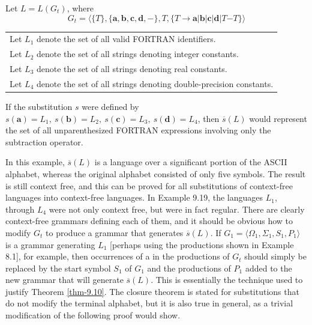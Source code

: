 Let $L=L(G_t)$, where
\[ G_t = \langle\{T\},\{\pmb{a},\pmb{b},\pmb{c},\pmb{d},\pmb{-}\},T,\{T
	\rightarrow\pmb{a}|\pmb{b}|\pmb{c}|\pmb{d}|T\pmb{-}T\}\rangle \]
\begin{center}\begin{tabular}{l}
Let $L_1$ denote the set of all valid FORTRAN identifiers. \\
Let $L_2$ denote the set of all strings denoting integer constants. \\
Let $L_3$ denote the set of all strings denoting real constants. \\
Let $L_4$ denote the set of all strings denoting double-precision constants. \\
\end{tabular}\end{center}
If the substitution $s$ were defined by $s(\pmb{a})=L_1,\ s(\pmb{b})=L_2,\ s(
\pmb{c})=L_3,\ s(\pmb{d})=L_4$, then $\overline{s}(L)$ would represent the set
of all unparenthesized FORTRAN expressions involving only the subtraction
operator.

In this example, $\overline{s}(L)$ is a language over a significant portion of
the ASCII alphabet, whereas the original alphabet consisted of only five symbols.
The result is still context free, and this can be proved for all substitutions
of context-free languages into context-free languages. In Example 9.19, the
languages $L_1$, through $L_4$ were not only context free, but were in fact
regular. There are clearly context-free grammars defining each of them, and it
should be obvious how to modify $G_t$ to produce a grammar that generates
$\overline{s}(L)$. If $G_1=\langle\Omega_1,\Sigma_1,S_1,P_1\rangle$ is a grammar
generating $L_1$ [perhaps using the productions shown in Example 8.1], for example, then occurrences of a in the productions of $G_t$
should simply be replaced by the start symbol $S_1$ of $G_1$ and the productions
of $P_1$ added to the new grammar that will generate $\overline{s}(L)$. This is
essentially the technique used to justify Theorem \ref{thm-9.10}. The closure theorem is
stated for substitutions that do not modify the terminal alphabet, but it is
also true in general, as a trivial modification of the following proof would
show.

